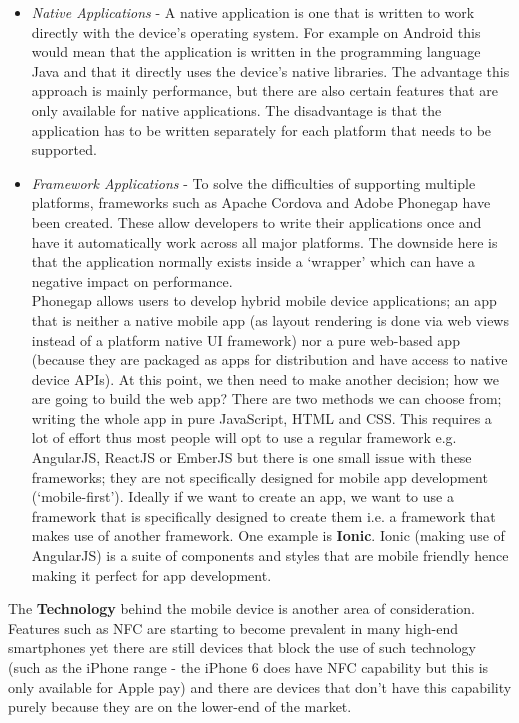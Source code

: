 \begin{itemize}
\item \emph{Native Applications} - A native application is one that is written to work directly with the device's operating system. For example on Android this would mean that the application is written in the programming language Java and that it directly uses the device's native libraries. The advantage this approach is mainly performance, but there are also certain features that are only available for native applications. The disadvantage is that the application has to be written separately for each platform that needs to be supported.
\item \emph{Framework Applications} - To solve the difficulties of supporting multiple platforms, frameworks such as Apache Cordova and Adobe Phonegap have been created. These allow developers to write their applications once and have it automatically work across all major platforms. The downside here is that the application normally exists inside a `wrapper' which can have a negative impact on performance.  \\
Phonegap allows users to develop hybrid mobile device applications; an app that is neither a native mobile app (as layout rendering is done via web views instead of a platform native UI framework) nor a pure web-based app (because they are packaged as apps for distribution and have access to native device APIs).  At this point, we then need to make another decision; how we are going to build the web app?  There are two methods we can choose from; writing the whole app in pure JavaScript, HTML and CSS.  This requires a lot of effort thus most people will opt to use a regular framework e.g. AngularJS, ReactJS or EmberJS but there is one small issue with these frameworks; they are not specifically designed for mobile app development (`mobile-first').  Ideally if we want to create an app, we want to use a framework that is specifically designed to create them i.e. a framework that makes use of another framework.  One example is \textbf{Ionic}.  Ionic (making use of AngularJS) is a suite of components and styles that are mobile friendly hence making it perfect for app development.
\end{itemize}
The \textbf{Technology} behind the mobile device is another area of consideration.  Features such as NFC are starting to become prevalent in many high-end smartphones yet there are still devices that block the use of such technology (such as the iPhone range - the iPhone 6 does have NFC capability but this is only available for Apple pay) and there are devices that don't have this capability purely because they are on the lower-end of the market.

